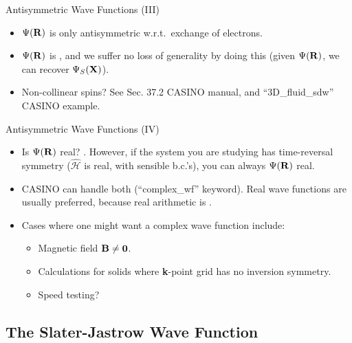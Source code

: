 \documentclass[12pt, pdf, hyperref={draft}, usenames, dvipsnames,
aspectratio=169]{beamer}
\newcommand{\red}[1]{{\bf\color{LancsRed}{#1}}}
\newcommand{\blue}[1]{{\bf\color{NavyBlue}{#1}}}
\newcommand{\green}[1]{{\bf\color{ForestGreen}{#1}}}
\begin{document}
\begin{frame}{Antisymmetric Wave Functions (III)}
\begin{itemize}
  \item $\Psi({\bf R})$ is only antisymmetric w.r.t.\ exchange of
  \blue{indistinguishable} electrons.
  \item $\Psi({\bf R})$ is \green{easier to work with}, and we suffer no loss of
  generality by doing this (given $\Psi({\bf R})$, we can recover
  $\Psi_{S}({\bf X})$).
  \item Non-collinear spins? See Sec. 37.2 CASINO manual, and
  ``3D\_fluid\_sdw'' CASINO example.
\end{itemize}
\end{frame}


\begin{frame}{Antisymmetric Wave Functions (IV)}
\begin{itemize}
  \item Is $\Psi({\bf R})$ real? \red{Generally, no}. However, if the system you are
  studying has time-reversal symmetry ($\mathcal{\hat H}$ is real, with
  sensible b.c.'s), you can always \green{choose} $\Psi({\bf R})$ real.
  \item CASINO can handle both (``complex\_wf'' keyword). Real wave functions
  are usually preferred, because real arithmetic is \green{faster}.
  \item Cases where one might want a complex wave function include:
  \begin{itemize}
    \item Magnetic field ${\bf B} \neq {\bf 0}$.
    \item Calculations for solids where {\bf k}-point grid has no inversion
    symmetry.
    \item Speed testing?
  \end{itemize}
\end{itemize}
\end{frame}


\subsection{The Slater-Jastrow Wave Function}\label{sub:the_sj_wave_function}
\end{document}
